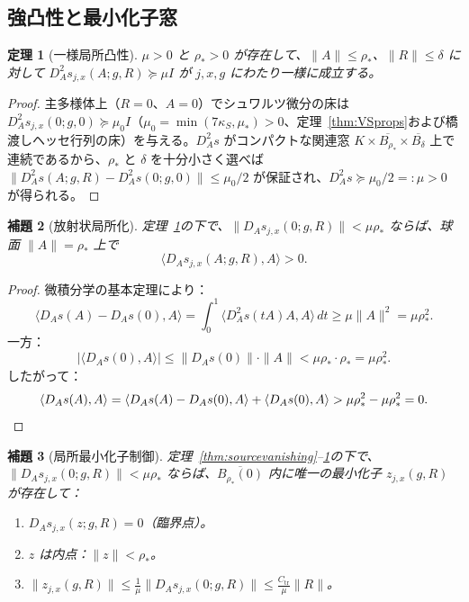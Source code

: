 \documentclass[12pt]{article}
\theoremstyle{plain}
\newtheorem{theorem}{定理}[section]
\newtheorem{lemma}[theorem]{補題}
\theoremstyle{definition}
\numberwithin{equation}{section}
\newcommand{\tr}{\mathrm{tr}}
\begin{document}
\subsection{強凸性と最小化子窓}

\begin{theorem}[一様局所凸性]\label{thm:convexity}
$\mu>0$ と $\rho_*>0$ が存在して、$\|A\|\leq\rho_*$、$\|R\|\leq\delta$ に対して $D_A^2 s_{j,x}(A;g,R)\succeq\mu I$ が $j,x,g$ にわたり一様に成立する。
\end{theorem}

\begin{proof}
主多様体上（$R=0$、$A=0$）でシュワルツ微分の床は $D_A^2 s_{j,x}(0;g,0)\succeq\mu_0 I$（$\mu_0=\min(7\kappa_S,\mu_*)>0$、定理~\ref{thm:VSprops}および橋渡しヘッセ行列の床）を与える。$D_A^2 s$ がコンパクトな関連窓 $K\times\overline{B_{\rho_*}}\times\overline{B_\delta}$ 上で連続であるから、$\rho_*$ と $\delta$ を十分小さく選べば $\|D_A^2 s(A;g,R)-D_A^2 s(0;g,0)\|\leq\mu_0/2$ が保証され、$D_A^2 s\succeq\mu_0/2=:\mu>0$ が得られる。
\end{proof}

\begin{lemma}[放射状局所化]\label{lem:radial}
定理~\ref{thm:convexity}の下で、$\|D_A s_{j,x}(0;g,R)\|<\mu\rho_*$ ならば、球面 $\|A\|=\rho_*$ 上で
\begin{equation}
\langle D_A s_{j,x}(A;g,R),A\rangle > 0.
\end{equation}
\end{lemma}

\begin{proof}
微積分学の基本定理により：
\begin{equation}
\langle D_A s(A)-D_A s(0),A\rangle = \int_0^1\langle D_A^2 s(tA)A,A\rangle\,dt \geq \mu\|A\|^2 = \mu\rho_*^2.
\end{equation}
一方：
\begin{equation}
|\langle D_A s(0),A\rangle| \leq \|D_A s(0)\|\cdot\|A\| < \mu\rho_*\cdot\rho_* = \mu\rho_*^2.
\end{equation}
したがって：
\begin{equation}
\langle D_A s(A),A\rangle = \langle D_A s(A)-D_A s(0),A\rangle + \langle D_A s(0),A\rangle > \mu\rho_*^2-\mu\rho_*^2 = 0.\qedhere
\end{equation}
\end{proof}

\begin{lemma}[局所最小化子制御]\label{lem:minimiser}
定理~\ref{thm:sourcevanishing}--\ref{thm:convexity}の下で、$\|D_As_{j,x}(0;g,R)\|<\mu\rho_*$ ならば、$\overline{B_{\rho_*}(0)}$ 内に唯一の最小化子 $z_{j,x}(g,R)$ が存在して：
\begin{enumerate}[label=(\roman*)]
\item $D_A s_{j,x}(z;g,R)=0$（臨界点）。
\item $z$ は内点：$\|z\|<\rho_*$。
\item $\|z_{j,x}(g,R)\|\leq\frac{1}{\mu}\|D_As_{j,x}(0;g,R)\|\leq\frac{C_{\tr}}{\mu}\|R\|$。
\end{enumerate}
\end{lemma}
\end{document}
